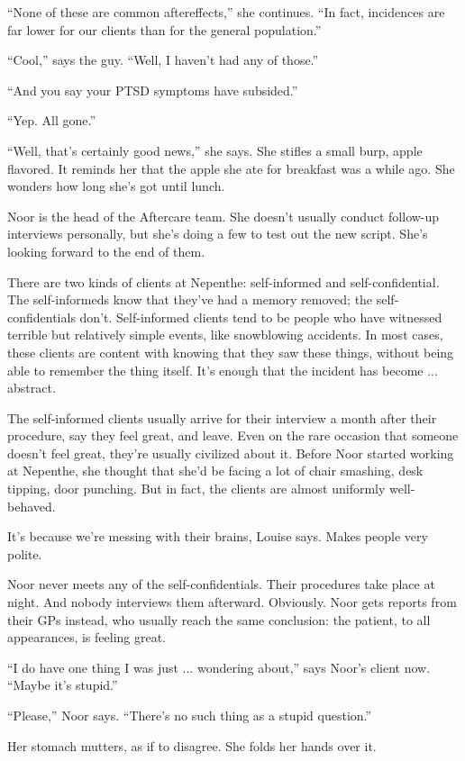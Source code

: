 \documentclass[12pt,a5paper]{book}
\newcommand{\qm}[1]{“#1”}
\begin{document}
\qm{None of these are common aftereffects,} she continues. \qm{In fact, incidences are far lower for our clients than for the general population.}

\qm{Cool,} says the guy. \qm{Well, I haven't had any of those.}

\qm{And you say your PTSD symptoms have subsided.}

\qm{Yep. All gone.}

\qm{Well, that's certainly good news,} she says. She stifles a small burp, apple flavored. It reminds her that the apple she ate for breakfast was a while ago. She wonders how long she's got until lunch.

Noor is the head of the Aftercare team. She doesn't usually conduct follow-up interviews personally, but she's doing a few to test out the new script. She's looking forward to the end of them.

There are two kinds of clients at Nepenthe: self-informed and self-confidential. The self-informeds know that they've had a memory removed; the self-confidentials don't. Self-informed clients tend to be people who have witnessed terrible but relatively simple events, like snowblowing accidents. In most cases, these clients are content with knowing that they saw these things, without being able to remember the thing itself. It's enough that the incident has become ... abstract.

The self-informed clients usually arrive for their interview a month after their procedure, say they feel great, and leave. Even on the rare occasion that someone doesn't feel great, they're usually civilized about it. Before Noor started working at Nepenthe, she thought that she'd be facing a lot of chair smashing, desk tipping, door punching. But in fact, the clients are almost uniformly well-behaved.

It's because we're messing with their brains, Louise says. Makes people very polite.

Noor never meets any of the self-confidentials. Their procedures take place at night. And nobody interviews them afterward. Obviously. Noor gets reports from their GPs instead, who usually reach the same conclusion: the patient, to all appearances, is feeling great.

\qm{I do have one thing I was just ... wondering about,} says Noor's client now. \qm{Maybe it's stupid.}

\qm{Please,} Noor says. \qm{There's no such thing as a stupid question.}

Her stomach mutters, as if to disagree. She folds her hands over it.
\end{document}
